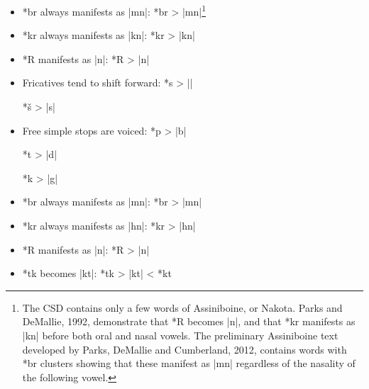 \documentclass[output=paper]{LSP/langsci}
\begin{document}
 
 \begin{itemize}
 \item  *br always manifests as |mn|:     \hspace{1.5em}  *br       >          |mn|\footnote{The CSD contains only a few words of Assiniboine, or Nakota.  Parks and DeMallie, 1992, demonstrate that *R becomes |n|, and that *kr manifests as |kn| before both oral and nasal vowels.  The preliminary Assiniboine text developed by Parks, DeMallie and Cumberland, 2012, contains words with *br clusters showing that these manifest as |mn| regardless of the nasality of the following vowel.}
 \item *kr always manifests as |kn|:       \hspace{1.6em}        *kr       >          |kn|
 \item *R manifests as |n|: \hspace{5.3em} *R	>	|n|
 \end{itemize}
  
 
 \begin{itemize}
 \item Fricatives tend to shift forward:  \hspace{.7em}   *s         >          ||

\hspace{13.6em}      *\v{s}         >          |s|

\item Free simple stops are voiced:  \hspace{1.6em}   *p        >          |b|

\hspace{13.6em}      *t         >          |d|

\hspace{13.6em}       *k        >          |g|

\item *br always manifests as |mn|: \hspace{1.6em}    *br       >          |mn|

\item *kr always manifests as |hn|:  \hspace{1.7em}   *kr       >          |hn|

\item *R manifests as |n|:  \hspace{6em}     *R       >          |n|

 \item *tk becomes |kt|:  \hspace{7em}      *tk       >          |kt|       <          *kt
 \end{itemize}
 
\end{document}
